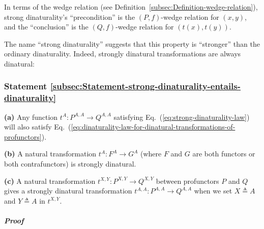 In terms of the wedge relation (see Definition~\ref{subsec:Definition-wedge-relation}),
strong dinaturality\textsf{'}s \textsf{``}precondition\textsf{''} is the $\left(P,f\right)$-wedge
relation for $(x,y)$, and the \textsf{``}conclusion\textsf{''} is the $\left(Q,f\right)$-wedge
relation for $(t(x),t(y))$.

The name \textsf{``}strong dinaturality\textsf{''} suggests that this property is
\textsf{``}stronger\textsf{''} than the ordinary dinaturality. Indeed, strongly dinatural
transformations are always dinatural:

\subsubsection{Statement \label{subsec:Statement-strong-dinaturality-entails-dinaturality}\ref{subsec:Statement-strong-dinaturality-entails-dinaturality}}

\textbf{(a)} Any function $t^{A}:P^{A,A}\rightarrow Q^{A,A}$ satisfying
Eq.~(\ref{eq:strong-dinaturality-law}) will also satisfy Eq.~(\ref{eq:dinaturality-law-for-dinatural-transformations-of-profunctors}).

\textbf{(b)} A natural transformation $t^{A}:F^{A}\rightarrow G^{A}$
(where $F$ and $G$ are both functors or both contrafunctors) is
strongly dinatural.

\textbf{(c)} A natural transformation $t^{X,Y}:P^{X,Y}\rightarrow Q^{X,Y}$
between profunctors $P$ and $Q$ gives a strongly dinatural transformation
$t^{A,A}:P^{A,A}\rightarrow Q^{A,A}$ when we set $X\triangleq A$
and $Y\triangleq A$ in $t^{X,Y}$.

\subparagraph{Proof}


